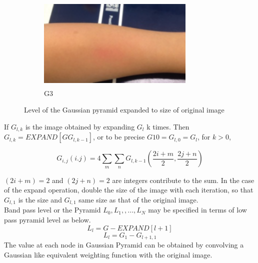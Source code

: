 \begin{figure}[!h]
\begin{subfigure}{.5\textwidth}
\end{subfigure}%
\begin{subfigure}{.5\textwidth}
  \centering
  \includegraphics[width=7.5cm,height=4.5cm]{img/eulerian/sample/2}
  \caption{G3}
  \label{fig:sub2}
\end{subfigure}
\caption{Level of the Gaussian pyramid expanded to size of original image}
\label{fig:test}
\end{figure}

\newpage
If $G_{l,k}$ is the image obtained by expanding $G_{l}$ k times. Then $G_{l,k}=EXPAND\left [ GG_{l,k-1} \right ]$, or to be precise $G10=G_{l,0}=G_{l}$, for $k>0$,

\begin{displaymath}
G_{i,j}\left (i.j \right )=4 \sum_{m}\sum_{n}G_{l,k-1}\left ( \frac{2i+m}{2},\frac{2j+n}{2} \right )
\end{displaymath}

$(2i + m)=2$ and $(2j + n)=2$ are integers contribute to
the sum. In the case of the expand operation, double the size of the image with each iteration, so that $G_{l,1}$ is the size and  $G_{l,1}$ same size as that of the original image. \\

Band pass level or the Pyramid $L_{0}, L_{1},,...,L_{N}$ may be specified in terms of low pass pyramid level as below.
\begin{displaymath}
L_{l}=G-EXPAND\left [ l+1 \right ]
\end{displaymath}
\begin{displaymath}
L_{l}=G_{1}-G_{l+1,1}
\end{displaymath}
The value at each node in Gaussian Pyramid can be obtained by convolving a Gaussian like equivalent weighting function with the original image.

